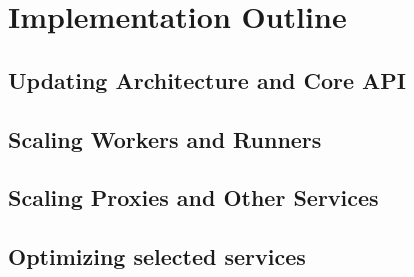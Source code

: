 \section{Implementation Outline}

\subsection{Updating Architecture and Core API}

\subsection{Scaling Workers and Runners}

\subsection{Scaling Proxies and Other Services}

\subsection{Optimizing selected services}
